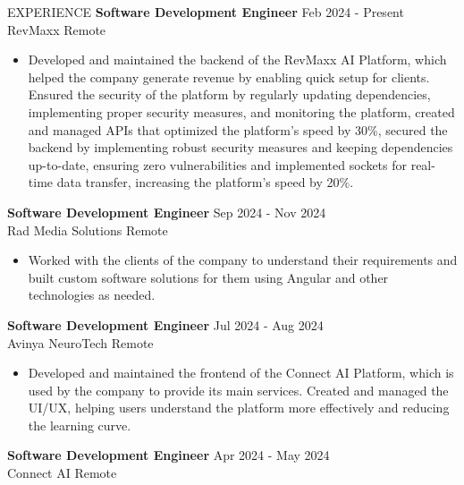 \documentclass{resume}
\begin{document}
\vspace{-0.4em}
\begin{rSection}{EXPERIENCE}
  {\bf Software Development Engineer} \hfill {Feb 2024 - Present}\\
  RevMaxx \hfill {Remote}
  \vspace{-0.4em}
  \begin{itemize}
    \item{Developed and maintained the backend of the RevMaxx AI Platform, which helped the company generate revenue by enabling quick setup for clients. Ensured the security of the platform by regularly updating dependencies, implementing proper security measures, and monitoring the platform, created and managed APIs that optimized the platform's speed by 30\%, secured the backend by implementing robust security measures and keeping dependencies up-to-date, ensuring zero vulnerabilities and implemented sockets for real-time data transfer, increasing the platform's speed by 20\%.}
  \end{itemize}
  \vspace{-0.4em}
  {\bf Software Development Engineer} \hfill {Sep 2024 - Nov 2024}\\
  Rad Media Solutions \hfill {Remote}
  \vspace{-0.4em}
  \begin{itemize}
    \item{Worked with the clients of the company to understand their requirements and built custom software solutions for them using Angular and other technologies as needed.}
  \end{itemize}
  \vspace{-0.4em}
  {\bf Software Development Engineer} \hfill {Jul 2024 - Aug 2024}\\
  Avinya NeuroTech \hfill {Remote}
  \vspace{-0.4em}
  \begin{itemize}
    \item{Developed and maintained the frontend of the Connect AI Platform, which is used by the company to provide its main services. Created and managed the UI/UX, helping users understand the platform more effectively and reducing the learning curve.}
  \end{itemize}
  \vspace{-0.4em}
  {\bf Software Development Engineer} \hfill {Apr 2024 - May 2024}\\
  Connect AI \hfill {Remote}
  \vspace{-0.4em}
  \begin{itemize}

\end{itemize}
\end{rSection}
\end{document}
